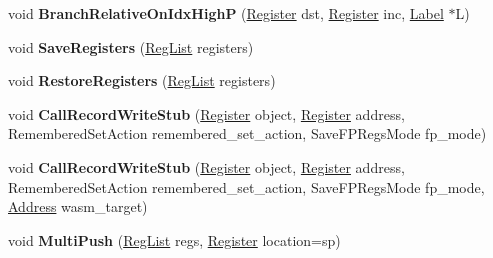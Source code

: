 \begin{DoxyCompactItemize}
\item 
\mbox{\label{classv8_1_1internal_1_1TurboAssembler_ae97afca0a652777201466decb4d658bb}} 
void {\bfseries Branch\+Relative\+On\+Idx\+HighP} (\mbox{\hyperlink{classv8_1_1internal_1_1Register}{Register}} dst, \mbox{\hyperlink{classv8_1_1internal_1_1Register}{Register}} inc, \mbox{\hyperlink{classv8_1_1internal_1_1Label}{Label}} $\ast$L)
\item 
\mbox{\label{classv8_1_1internal_1_1TurboAssembler_adb2676d473b8bdff1c6856758eabfa71}} 
void {\bfseries Save\+Registers} (\mbox{\hyperlink{classuint32__t}{Reg\+List}} registers)
\item 
\mbox{\label{classv8_1_1internal_1_1TurboAssembler_a1ff5e6044d8b7223b66061f3ed4123f1}} 
void {\bfseries Restore\+Registers} (\mbox{\hyperlink{classuint32__t}{Reg\+List}} registers)
\item 
\mbox{\label{classv8_1_1internal_1_1TurboAssembler_ab10280acd4d7aebd053a430cbea68fb1}} 
void {\bfseries Call\+Record\+Write\+Stub} (\mbox{\hyperlink{classv8_1_1internal_1_1Register}{Register}} object, \mbox{\hyperlink{classv8_1_1internal_1_1Register}{Register}} address, Remembered\+Set\+Action remembered\+\_\+set\+\_\+action, Save\+F\+P\+Regs\+Mode fp\+\_\+mode)
\item 
\mbox{\label{classv8_1_1internal_1_1TurboAssembler_a2bc1271b1999cb2ee3784489515931b6}} 
void {\bfseries Call\+Record\+Write\+Stub} (\mbox{\hyperlink{classv8_1_1internal_1_1Register}{Register}} object, \mbox{\hyperlink{classv8_1_1internal_1_1Register}{Register}} address, Remembered\+Set\+Action remembered\+\_\+set\+\_\+action, Save\+F\+P\+Regs\+Mode fp\+\_\+mode, \mbox{\hyperlink{classuintptr__t}{Address}} wasm\+\_\+target)
\item 
\mbox{\label{classv8_1_1internal_1_1TurboAssembler_a9de5c47049739b97a60dd316fb39fed6}} 
void {\bfseries Multi\+Push} (\mbox{\hyperlink{classuint32__t}{Reg\+List}} regs, \mbox{\hyperlink{classv8_1_1internal_1_1Register}{Register}} location=sp)
\item 
\mbox{\label{classv8_1_1internal_1_1TurboAssembler_a8013d77ea3081712f3d2e818a6fb47ed}} 

\end{DoxyCompactItemize}
